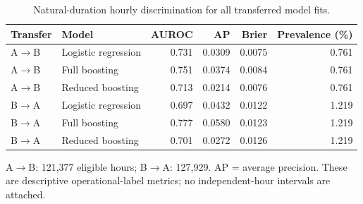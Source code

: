 \begin{table}[htbp]
\centering
\small
\setlength{\tabcolsep}{4pt}
\renewcommand{\arraystretch}{1.18}
\caption{Natural-duration hourly discrimination for all transferred model fits.}\label{tab:sdisc}
\begin{tabular}{llrrrr}
\toprule
Transfer & Model & AUROC & AP & Brier & Prevalence (\%) \\
\midrule
A$\to$B & Logistic regression & 0.731 & 0.0309 & 0.0075 & 0.761 \\
A$\to$B & Full boosting & 0.751 & 0.0374 & 0.0084 & 0.761 \\
A$\to$B & Reduced boosting & 0.713 & 0.0214 & 0.0076 & 0.761 \\
B$\to$A & Logistic regression & 0.697 & 0.0432 & 0.0122 & 1.219 \\
B$\to$A & Full boosting & 0.777 & 0.0580 & 0.0123 & 1.219 \\
B$\to$A & Reduced boosting & 0.701 & 0.0272 & 0.0126 & 1.219 \\
\bottomrule
\end{tabular}
\par\vspace{3pt}\begin{minipage}{\linewidth}\footnotesize A$\to$B: 121,377 eligible hours; B$\to$A: 127,929. AP = average precision. These are descriptive operational-label metrics; no independent-hour intervals are attached.\end{minipage}
\end{table}
